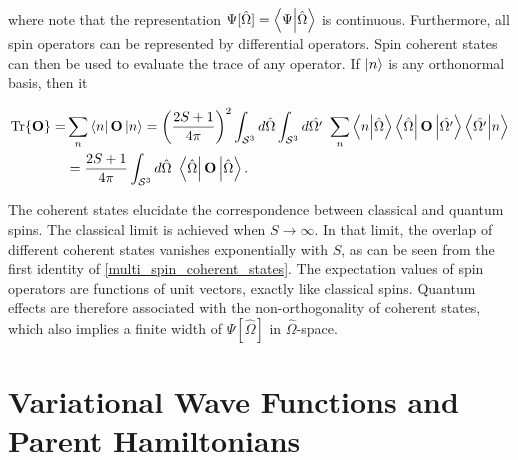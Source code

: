 \documentclass{homework}
\begin{document}
\begin{equation}
\begin{split}
    \label{multi_coherent_states_identities}
\end{split}
\end{equation}

where note that the representation $\Psi[\hat{\Omega}] = \bra{\Psi}\ket{\hat{\Omega}}$ is continuous. Furthermore, all spin operators can be represented by differential operators. Spin coherent states can then be used to evaluate the trace of any operator. If $\ket{n}$ is any orthonormal basis, then it

\begin{equation} \begin{split}
    \Tr {{\bf O}} =& \sum_{n} \bra{n}{{\bf O}}\ket{n} = \bigg(\frac{2S+1}{4\pi}\bigg)^2 \int_{\mathcal{S}^3} d\hat{\Omega}  \int_{\mathcal{S}^3} d\hat{\Omega'} \textnormal{ } \sum_{n} \bra{n}\ket{\hat{\Omega}} \bra{\hat{\Omega}}{{\bf O}}\ket{\hat{\Omega'}} \bra{\hat{\Omega'}} \ket{n} \\
    &= \frac{2S+1}{4\pi }\int_{\mathcal{S}^3} d\hat{\Omega} \textnormal{ } \bra{\hat{\Omega}}{{\bf O}}\ket{\hat{\Omega}}.
\end{split}
\label{multi_spin_coherent_states}
\end{equation}

The coherent states elucidate the correspondence between classical and quantum spins. The classical limit is achieved when $S\rightarrow\infty$. In that limit, the overlap of different coherent states vanishes exponentially with $S$, as can be seen from the first identity of \cref{multi_spin_coherent_states}. The expectation values of spin operators are functions of unit vectors, exactly like classical spins. Quantum effects are therefore associated with the non-orthogonality of coherent states, which also implies a finite width of $\Psi[\hat{\Omega}]$ in $\hat{\Omega}$-space. \\

\clearpage

\section{\textbf{Variational Wave Functions and Parent Hamiltonians}}

\blanky \\
\end{document}
